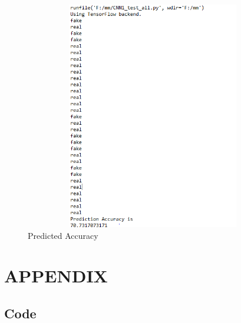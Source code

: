 \documentclass[a4paper,12pt,oneside]{article}
\begin{document}
\begin{figure}[H]
\centering
\includegraphics[height=10cm,width=15cm]{predct.PNG}
\caption{Predicted Accuracy }
\end{figure}












\newpage
\section{APPENDIX}
\subsection{Code}
\end{document}
